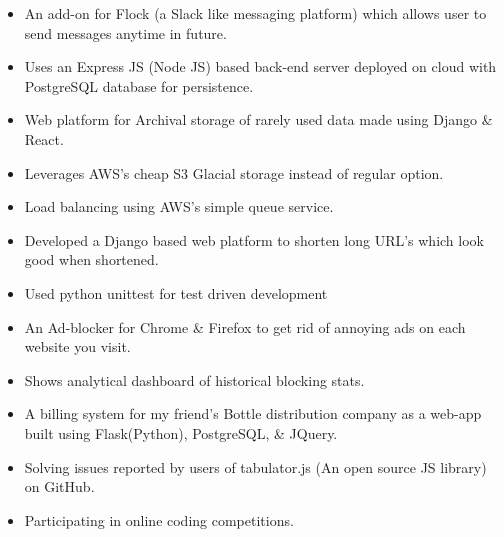 \begin{itemize}
\item An add-on for Flock (a Slack like messaging platform) which allows user to send messages anytime in future.
\item Uses an Express JS (Node JS) based back-end server deployed on cloud with PostgreSQL database for persistence.

\end{itemize}
\smallskip
{}
\begin{itemize}
\item Web platform for Archival storage of rarely used data made using Django \& React.
\item Leverages AWS's cheap S3 Glacial storage instead of regular option.
\item Load balancing using AWS's simple queue service.
\end{itemize}
\smallskip
{}
\begin{itemize}
\item Developed a Django based web platform to shorten long URL's which look good when shortened.
\item Used python unittest for test driven development
\end{itemize}
\smallskip

\begin{itemize}
\item An Ad-blocker for Chrome \& Firefox to get rid of annoying ads on each website you visit.
\item Shows analytical dashboard of historical blocking stats. 
\end{itemize}

\begin{itemize}
\item A  billing  system  for  my  friend's  Bottle  distribution  company as a web-app built using Flask(Python), PostgreSQL, \& JQuery.
\end{itemize}



\smallskip
\begin{itemize}
\item Solving issues reported by users of tabulator.js (An open source JS library) on GitHub.
\smallskip
\item Participating in online coding competitions.
\smallskip
\end{itemize}

\cvproject{}